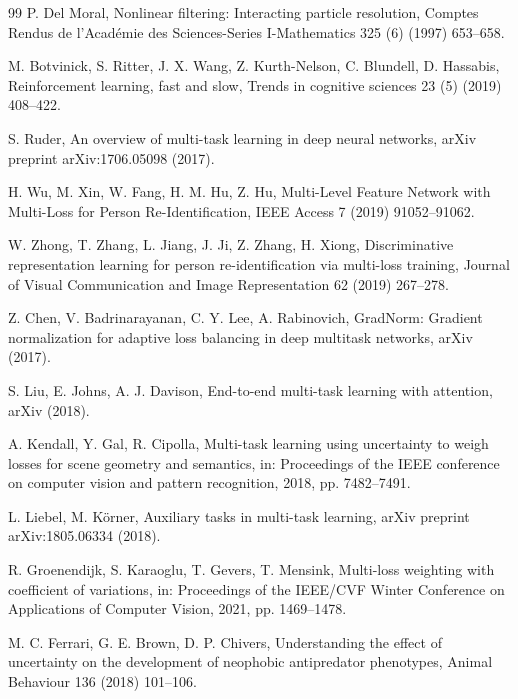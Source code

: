 \documentclass[12pt,a4paper]{article}
\begin{document}
\begin{thebibliography}{99}
		P. Del Moral, Nonlinear filtering: Interacting particle resolution, Comptes Rendus de l'Académie des Sciences-Series I-Mathematics 325 (6) (1997) 653--658.
		
		M. Botvinick, S. Ritter, J. X. Wang, Z. Kurth-Nelson, C. Blundell, D. Hassabis, Reinforcement learning, fast and slow, Trends in cognitive sciences 23 (5) (2019) 408--422.
		
		S. Ruder, An overview of multi-task learning in deep neural networks, arXiv preprint arXiv:1706.05098 (2017).
		
		H. Wu, M. Xin, W. Fang, H. M. Hu, Z. Hu, Multi-Level Feature Network with Multi-Loss for Person Re-Identification, IEEE Access 7 (2019) 91052--91062.
		
		W. Zhong, T. Zhang, L. Jiang, J. Ji, Z. Zhang, H. Xiong, Discriminative representation learning for person re-identification via multi-loss training, Journal of Visual Communication and Image Representation 62 (2019) 267--278.
		
		Z. Chen, V. Badrinarayanan, C. Y. Lee, A. Rabinovich, GradNorm: Gradient normalization for adaptive loss balancing in deep multitask networks, arXiv (2017).
		
		S. Liu, E. Johns, A. J. Davison, End-to-end multi-task learning with attention, arXiv (2018).
		
		A. Kendall, Y. Gal, R. Cipolla, Multi-task learning using uncertainty to weigh losses for scene geometry and semantics, in: Proceedings of the IEEE conference on computer vision and pattern recognition, 2018, pp. 7482--7491.
		
		L. Liebel, M. Körner, Auxiliary tasks in multi-task learning, arXiv preprint arXiv:1805.06334 (2018).
		
		R. Groenendijk, S. Karaoglu, T. Gevers, T. Mensink, Multi-loss weighting with coefficient of variations, in: Proceedings of the IEEE/CVF Winter Conference on Applications of Computer Vision, 2021, pp. 1469--1478.
		
		M. C. Ferrari, G. E. Brown, D. P. Chivers, Understanding the effect of uncertainty on the development of neophobic antipredator phenotypes, Animal Behaviour 136 (2018) 101--106.
		

\end{thebibliography}
\end{document}
